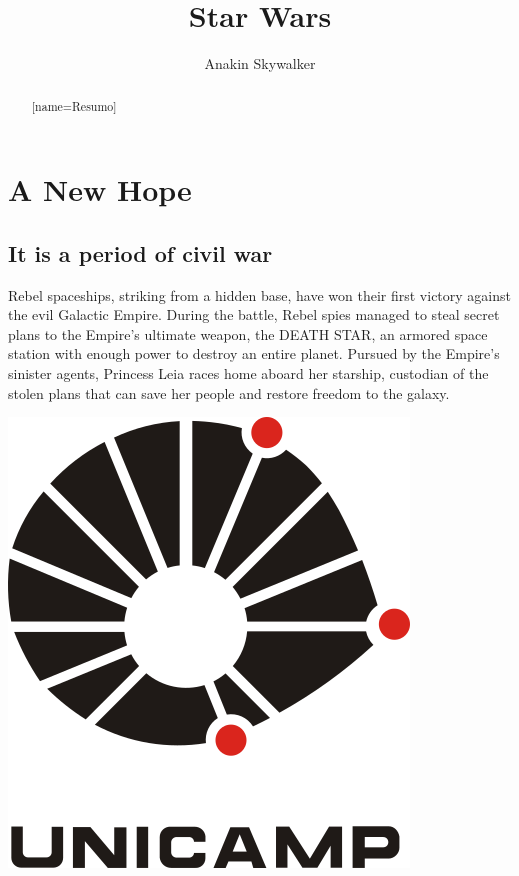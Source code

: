 \documentclass[oneside]{ifgw}
\title{Star Wars}
\author{Anakin Skywalker}
\institute{Instituto de Física ``Gleb Wataghin''}
\begin{document}

\maketitle
\facepage


\begin{abstract}[name=Resumo]
\lipsum[1-2]
\end{abstract}

\begin{abstract}
\lipsum[1-2]
\end{abstract}

\tableofcontents


\chapter{A New Hope}

\section{It is a period of civil war}

Rebel spaceships, striking from a hidden base, have won their first victory against the evil Galactic Empire.  During the battle, Rebel spies managed to steal secret plans to the Empire's ultimate weapon, the DEATH STAR, an armored space station with enough power to destroy an entire planet. Pursued by the Empire's sinister agents, Princess Leia races home aboard her starship, custodian of the stolen plans that can save her people and restore freedom to the galaxy.


\lipsum[1-4]


\begin{center}
\includegraphics[width=.35\textwidth]{Images/unicamp.png}
\end{center}
\end{document}
